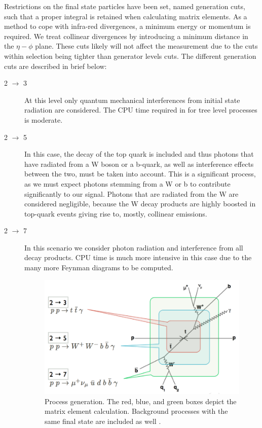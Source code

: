 Restrictions on the final state particles have been set, named generation cuts, such that a proper integral is retained when calculating matrix elements. As a method to cope with infra-red divergences, a minimum energy or momentum is required. We treat collinear divergences by introducing a minimum distance in the $\eta - \phi$ plane. These cuts likely will not affect the measurement due to the cuts within selection being tighter than generator levels cuts. The different generation cuts are described in brief below:

\begin{description}
\item[2 $\to$ 3] At this level only quantum mechanical interferences from initial state radiation are considered. The CPU time required in for tree level processes is moderate.

\item[2 $\to$ 5] In this case, the decay of the top quark is included and thus photons that have radiated from a W boson or a b-quark, as well as interference effects between the two, must be taken into account. This is a significant process, as we must expect photons stemming from a W or b to contribute significantly to our signal. Photons that are radiated from the W are considered negligible, because the W decay products are highly boosted in top-quark events giving rise to, mostly, collinear emissions. 

\item[2 $\to$ 7] In this scenario we consider photon radiation and interference from all decay products. CPU time is much more intensive in this case due to the many more Feynman diagrams to be computed.                                                                            

\begin{figure} \label{fig-MatrixElementCalculation}
\begin{center}
\includegraphics[width=\textwidth]{Figures/MatrixElementCalculation.png}
\caption{Process generation. The red, blue, and green boxes depict the matrix element calculation. Background processes with the same final state are included as well \cite{heinerthesis}.}
\end{center}
\end{figure}
                               

\end{description}

